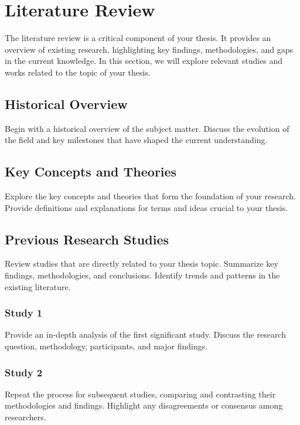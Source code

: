 \section{Literature Review}

The literature review is a critical component of your thesis. It provides an overview of existing research, highlighting key findings, methodologies, and gaps in the current knowledge. In this section, we will explore relevant studies and works related to the topic of your thesis.

\subsection{Historical Overview}

Begin with a historical overview of the subject matter. Discuss the evolution of the field and key milestones that have shaped the current understanding.

\subsection{Key Concepts and Theories}

Explore the key concepts and theories that form the foundation of your research. Provide definitions and explanations for terms and ideas crucial to your thesis.

\subsection{Previous Research Studies}

Review studies that are directly related to your thesis topic. Summarize key findings, methodologies, and conclusions. Identify trends and patterns in the existing literature.

\subsubsection{Study 1}

Provide an in-depth analysis of the first significant study. Discuss the research question, methodology, participants, and major findings.

\subsubsection{Study 2}

Repeat the process for subsequent studies, comparing and contrasting their methodologies and findings. Highlight any disagreements or consensus among researchers.


